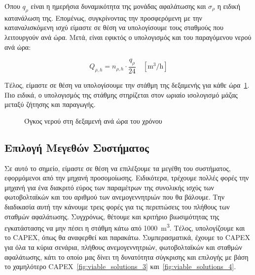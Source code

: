 Όπου \(q_{\rho}\) είναι η ημερήσια δυναμικότητα της μονάδας αφαλάτωσης και
\(\sigma_{\rho}\) η ειδική κατανάλωση της. Επομένως, συγκρίνοντας την
προσφερόμενη με την καταναλισκόμενη ισχύ είμαστε σε θέση να υπολογίσουμε τους
σταθμούς που λειτουργούν ανά ώρα. Μετά, είναι εφικτός ο υπολογισμός και του
παραγόμενου νερού ανά ώρα:

\begin{equation}\label{eq:hourly_desalination_production}
	Q_{\rho , h}=n_{\rho ,h}\cdot \frac{q_{\rho}}{24}\quad \left[\si{\cubic\meter\per\hour}\right]
\end{equation}

Τέλος, είμαστε σε θέση να υπολογίσουμε την στάθμη της δεξαμενής για κάθε ώρα~\ref{fig:tank_level}.
Πιο ειδικά, ο υπολογισμός της στάθμης στηρίζεται στον ωριαίο ισολογισμό μάζας
μεταξύ ζήτησης και παραγωγής.

\begin{figure}
	\centering
	\caption{Όγκος νερού στη δεξαμενή ανά ώρα του χρόνου}\label{fig:tank_level}
\end{figure}

\subsection{Επιλογή Μεγεθών Συστήματος}

Σε αυτό το σημείο, είμαστε σε θέση να επιλέξουμε τα μεγέθη του συστήματος,
εφορμόμενοι από την μηχανή προσομοίωσης. Ειδικότερα, τρέχουμε πολλές φορές την
μηχανή για ένα διακριτό εύρος των παραμέτρων της συνολικής ισχύς των
φωτοβολταϊκών και του αριθμού των ανεμογεννητριών που θα βάλουμε. Την
διαδικασία αυτή την κάνουμε τρεις φορές για τις περιπτώσεις του πλήθους των
σταθμών αφαλάτωσης. Συγχρόνως, θέτουμε και κριτήριο βιωσιμότητας της
εγκατάστασης να μην πέσει η στάθμη κάτω από \qty{1000}{\cubic\meter}. Τέλος,
υπολογίζουμε και το CAPEX, όπως θα αναφερθεί και παρακάτω. Συμπερασματικά,
έχουμε το CAPEX για όλα τα κύρια σενάρια, πλήθους ανεμογεννητριών,
φωτοβολταϊκών και σταθμών αφαλάτωσης, κάτι το οποίο μας δίνει τη δυνατότητα
σύγκρισης και επιλογής με βάση το χαμηλότερο CAPEX~\ref{fig:viable_solutions_3}
και~\ref{fig:viable_solutions_4}.

